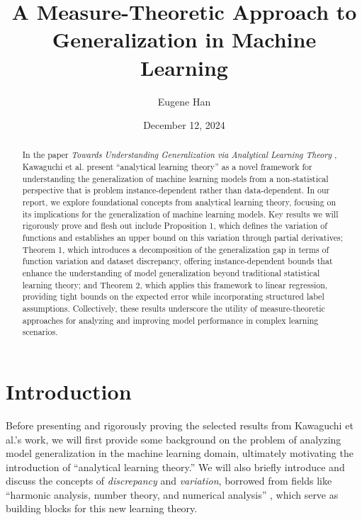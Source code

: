\documentclass{article}
\title{\textbf{A Measure-Theoretic Approach to Generalization in Machine Learning}}
\author[]{Eugene Han}
\affil[]{\normalsize Yale University}
\date{December 12, 2024}
\begin{document}
\maketitle

\begin{abstract}
    \noindent In the paper \textit{Towards Understanding Generalization via Analytical Learning Theory} \cite{kawaguchi2018}, Kawaguchi et al. present ``analytical learning theory'' as a novel framework for understanding the generalization of machine learning models from a non-statistical perspective that is problem instance-dependent rather than data-dependent. In our report, we explore foundational concepts from analytical learning theory, focusing on its implications for the generalization of machine learning models. Key results we will rigorously prove and flesh out include Proposition 1, which defines the variation of functions and establishes an upper bound on this variation through partial derivatives; Theorem 1, which introduces a decomposition of the generalization gap in terms of function variation and dataset discrepancy, offering instance-dependent bounds that enhance the understanding of model generalization beyond traditional statistical learning theory; and Theorem 2, which applies this framework to linear regression, providing tight bounds on the expected error while incorporating structured label assumptions. Collectively, these results underscore the utility of measure-theoretic approaches for analyzing and improving model performance in complex learning scenarios.
\end{abstract}

\section{Introduction}
Before presenting and rigorously proving the selected results from Kawaguchi et al.'s work, we will first provide some background on the problem of analyzing model generalization in the machine learning domain, ultimately motivating the introduction of ``analytical learning theory.'' We will also briefly introduce and discuss the concepts of \textit{discrepancy} and \textit{variation}, borrowed from fields like ``harmonic analysis, number theory, and numerical analysis'' \cite{kawaguchi2018}, which serve as building blocks for this new learning theory.
\end{document}
